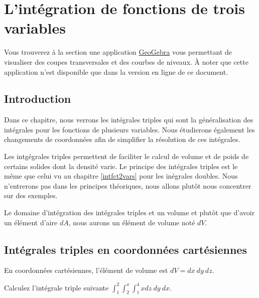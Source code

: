\documentclass[]{book}
\theoremstyle{definition}
\theoremstyle{definition}
\theoremstyle{definition}
\theoremstyle{remark}
\let\BeginKnitrBlock\begin \let\EndKnitrBlock\end
\begin{document}
\hypertarget{intfct3vars}{%
\chapter{L'intégration de fonctions de trois
variables}\label{intfct3vars}}

Vous trouverez à la section une application
\href{https://www.geogebra.org/?lang=fr}{GeoGebra} vous permettant de
visualiser des coupes transversales et des courbes de niveaux. À noter
que cette application n'est disponible que dans la version en ligne de
ce document.

\hypertarget{introduction-7}{%
\section{Introduction}\label{introduction-7}}

Dans ce chapitre, nous verrons les intégrales triples qui sont la
généralisation des intégrales pour les fonctions de plusieurs variables.
Nous étudierons également les changements de coordonnées afin de
simplifier la résolution de ces intégrales.

Les intgégrales triples permettent de faciliter le calcul de volume et
de poids de certains solides dont la densité varie. Le principe des
intégrales triples est le même que celui vu au chapitre
\ref{intfct2vars} pour les inégrales doubles. Nous n'entrerons pas dans
les principes théoriques, nous allons plutôt nous concentrer sur des
exemples.

\BeginKnitrBlock{remark}
{}Le domaine d'intégration des intégrales
triples et un volume et plutôt que d'avoir un élément d'aire \(dA\),
nous aurons un élément de volume noté \(dV\).
\EndKnitrBlock{remark}

\hypertarget{integrales-triples-en-coordonnees-cartesiennes}{%
\section{Intégrales triples en coordonnées
cartésiennes}\label{integrales-triples-en-coordonnees-cartesiennes}}

En coordonnées cartésiennes, l'élément de volume est \(dV=dx\ dy\ dz\).

\BeginKnitrBlock{example}
\protect\hypertarget{exm:unnamed-chunk-272}{}{\label{exm:unnamed-chunk-272}
}Calculez l'intégrale triple suivante
\(\int_1^2 \int_2^x \int_1^4 xdz\ dy\ dx\).
\EndKnitrBlock{example}
\vspace*{5cm}
\end{document}
